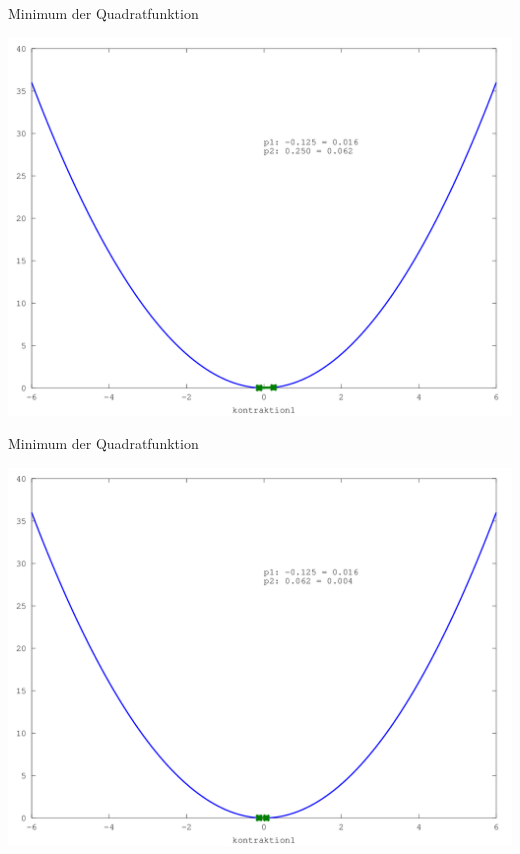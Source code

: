 \documentclass[\outputformat]{beamer}
\begin{document}
\begin{frame}{Minimum der Quadratfunktion}
	\begin{center}
		\includegraphics[height=0.75\paperheight]{../bilder/Quadrat/sinx_x006.png}
	\end{center}
\end{frame}
\begin{frame}{Minimum der Quadratfunktion}
	\begin{center}
		\includegraphics[height=0.75\paperheight]{../bilder/Quadrat/sinx_x007.png}
	\end{center}
\end{frame}
\end{document}
